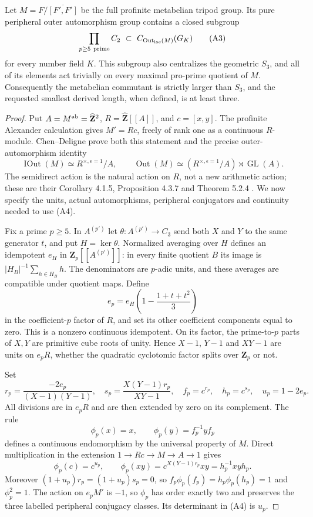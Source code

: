 \begin{proposition}
\label{A:metabelian-commutant}
Let $M=F/\overline{[F',F']}$ be the full profinite metabelian
tripod group.  Its pure peripheral outer automorphism group
contains a closed subgroup
\[
       \prod_{p\geq5\ \mathrm{prime}} C_2
       \ \subset\ C_{\operatorname{Out}_{\rm lac}(M)}(G_K)
                                                               \tag{A3}
\]
for every number field $K$.  This subgroup also centralizes the
geometric $S_3$, and all of its elements act trivially on every
maximal pro-prime quotient of $M$.  Consequently the metabelian
commutant is strictly larger than $S_3$, and the requested
smallest derived length, when defined, is at least three.
\end{proposition}
\begin{proof}
Put $A=M^{\rm ab}=\widehat{\mathbf Z}^2$,
$R=\widehat{\mathbf Z}[[A]]$, and $c=[x,y]$.
The profinite Alexander calculation gives $M'=Rc$, freely of
rank one as a continuous $R$-module.  Chen--Deligne prove both
this statement and the precise outer-automorphism identity
\[
 \operatorname{IOut}(M)\simeq R^{\times,\epsilon=1}/A,
 \qquad
 \operatorname{Out}(M)\simeq
       (R^{\times,\epsilon=1}/A)\rtimes\operatorname{GL}(A).
                                                               \tag{A4}
\]
The semidirect action is the natural action on $R$, not a
new arithmetic action; these are their Corollary 4.1.5,
Proposition 4.3.7 and Theorem 5.2.4
\cite{A_ChenDeligne2017}.  We now specify the units, actual
automorphisms, peripheral conjugators and continuity needed
to use (A4).

Fix a prime $p\geq5$.  In $A^{(p')}$ let
$\theta:A^{(p')}\to C_3$ send both $X$ and $Y$ to the same
generator $t$, and put $H=\ker\theta$.  Normalized averaging
over $H$ defines an idempotent $e_H$ in
$\mathbf Z_p[[A^{(p')}]]$: in every finite quotient $B$ its
image is $|H_B|^{-1}\sum_{h\in H_B}h$.  The denominators are
$p$-adic units, and these averages are compatible under
quotient maps.  Define
\[
 e_p=e_H\left(1-\frac{1+t+t^2}{3}\right)
\]
in the coefficient-$p$ factor of $R$, and set its other
coefficient components equal to zero.  This is a nonzero
continuous idempotent.  On its factor, the prime-to-$p$
parts of $X,Y$ are primitive cube roots of unity.  Hence
$X-1$, $Y-1$ and $XY-1$ are units on $e_pR$, whether the
quadratic cyclotomic factor splits over $\mathbf Z_p$ or not.

Set
\[
 r_p=\frac{-2e_p}{(X-1)(Y-1)},\quad
 s_p=\frac{X(Y-1)r_p}{XY-1},\quad
 f_p=c^{r_p},\quad h_p=c^{s_p},\quad u_p=1-2e_p.
\]
All divisions are in $e_pR$ and are then extended by zero
on its complement.  The rule
\[
       \phi_p(x)=x,\qquad \phi_p(y)=f_p^{-1}yf_p             \tag{A5}
\]
defines a continuous endomorphism by the universal property
of $M$.  Direct multiplication in the extension
$1\to Rc\to M\to A\to1$ gives
\[
 \phi_p(c)=c^{u_p},\qquad
 \phi_p(xy)=c^{X(Y-1)r_p}xy=h_p^{-1}xyh_p.
\]
Moreover $(1+u_p)r_p=(1+u_p)s_p=0$, so
$f_p\phi_p(f_p)=h_p\phi_p(h_p)=1$ and $\phi_p^2=1$.
The action on $e_pM'$ is $-1$, so $\phi_p$ has order
exactly two and preserves the three labelled peripheral
conjugacy classes.  Its determinant in (A4) is $u_p$.


\end{proof}
